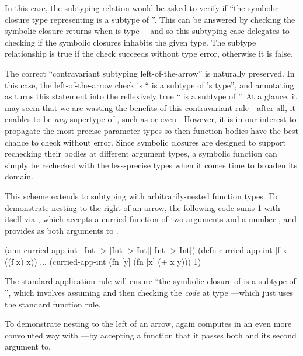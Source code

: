 In this case, the subtyping relation would be asked to verify if
``the symbolic closure type representing 
is a subtype of ''.
This can be answered by checking the symbolic closure
returns  when 
 is type ---and so this subtyping case
delegates to checking if the symbolic closures inhabits the given type.
The subtype relationship is true if the check succeeds without type error,
otherwise it is false.

The correct ``contravariant subtyping left-of-the-arrow''
is naturally preserved.
In this case, the left-of-the-arrow check is `` is a subtype of 's type'', and
annotating  as  turns this statement into the reflexively true `` is a subtype of ''.
At a glance, it may seem that we are wasting the benefits
of this contravariant rule---after all, it enables  to be \emph{any} supertype of
, such as  or even .
However, it is in our interest to propagate the most precise parameter types
so then function bodies have the best chance to check without error.
Since symbolic closures are designed to support rechecking their bodies at different argument types,
a symbolic function can simply be rechecked with the less-precise types
when it comes time to broaden its domain.

This scheme extends to subtyping with arbitrarily-nested function types.
To demonstrate nesting to the right of an arrow,
the following code sums 1 with itself via
, which accepts a curried
function of two arguments  and a number , and 
provides  as both arguments to .

\begin{cljlisting}
(ann curried-app-int [[Int -> [Int -> Int]] Int -> Int])
(defn curried-app-int [f x] ((f x) x))
...
(curried-app-int (fn [y] (fn [x] (+ x y))) 1)
\end{cljlisting}

The standard application rule will ensure 
``the symbolic closure of 
is a subtype of
'', which involves assuming
 and then checking the \emph{code} 
at type ---which just uses the standard
function rule.

To demonstrate nesting to the left of an arrow,
 again computes 
in an even more convoluted way with ---by accepting a function
 that it passes both  and its second argument to.

